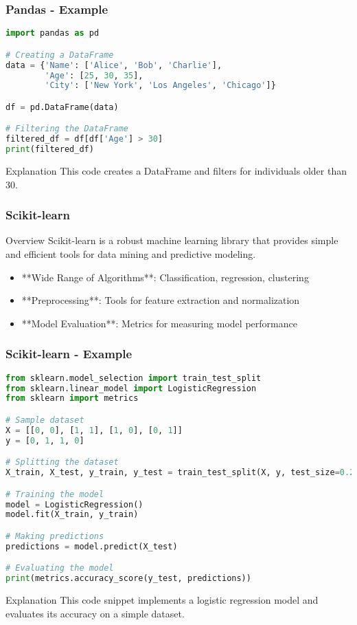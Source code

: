\documentclass[aspectratio=169]{beamer}
\begin{document}
\begin{frame}[fragile]
    \frametitle{Pandas - Example}
    \begin{lstlisting}[language=Python]
import pandas as pd

# Creating a DataFrame
data = {'Name': ['Alice', 'Bob', 'Charlie'],
        'Age': [25, 30, 35],
        'City': ['New York', 'Los Angeles', 'Chicago']}

df = pd.DataFrame(data)

# Filtering the DataFrame
filtered_df = df[df['Age'] > 30]
print(filtered_df)
    \end{lstlisting}
    \begin{block}{Explanation}
        This code creates a DataFrame and filters for individuals older than 30.
    \end{block}
\end{frame}

\begin{frame}
    \frametitle{Scikit-learn}
    \begin{block}{Overview}
        Scikit-learn is a robust machine learning library that provides simple and efficient tools for data mining and predictive modeling.
    \end{block}
    
    \begin{itemize}
        \item **Wide Range of Algorithms**: Classification, regression, clustering
        \item **Preprocessing**: Tools for feature extraction and normalization
        \item **Model Evaluation**: Metrics for measuring model performance
    \end{itemize}
\end{frame}

\begin{frame}[fragile]
    \frametitle{Scikit-learn - Example}
    \begin{lstlisting}[language=Python]
from sklearn.model_selection import train_test_split
from sklearn.linear_model import LogisticRegression
from sklearn import metrics

# Sample dataset
X = [[0, 0], [1, 1], [1, 0], [0, 1]]
y = [0, 1, 1, 0]

# Splitting the dataset
X_train, X_test, y_train, y_test = train_test_split(X, y, test_size=0.2)

# Training the model
model = LogisticRegression()
model.fit(X_train, y_train)

# Making predictions
predictions = model.predict(X_test)

# Evaluating the model
print(metrics.accuracy_score(y_test, predictions))
    \end{lstlisting}
    \begin{block}{Explanation}
        This code snippet implements a logistic regression model and evaluates its accuracy on a simple dataset.
    \end{block}
\end{frame}
\end{document}
